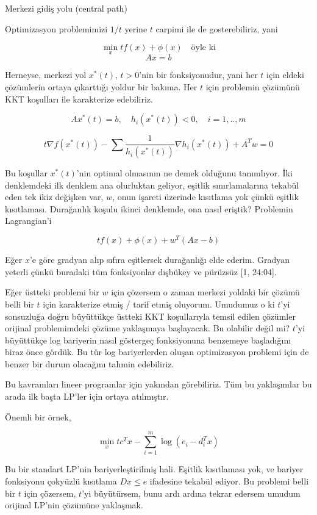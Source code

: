 \documentclass[12pt,fleqn]{article}\usepackage{../../common}
\begin{document}
Merkezi gidiş yolu (central path)

Optimizasyon problemimizi $1/t$ yerine $t$ carpimi ile de gosterebiliriz,
yani

$$
\min_x t f(x) + \phi(x) \quad \textrm{öyle ki}
$$
$$
Ax = b
$$

Herneyse, merkezi yol $x^\ast(t)$, $t>0$'nin bir fonksiyonudur, yani her $t$
için eldeki çözümlerin ortaya çıkarttığı yoldur bir bakıma. Her $t$ için
problemin çözümünü KKT koşulları ile karakterize edebiliriz. 

$$
Ax^\ast(t) = b, \quad h_i(x^\ast(t)) < 0, \quad i=1,..,m
$$

$$
t \nabla f(x^\ast(t)) - \sum \frac{1}{h_i(x^\ast(t))} \nabla h_i(x^\ast(t)) + A^T w= 0
$$

Bu koşullar $x^\ast(t)$'nin optimal olmasının ne demek olduğunu
tanımlıyor. İki denklemdeki ilk denklem ana olurluktan geliyor, eşitlik
sınırlamalarına tekabül eden tek ikiz değişken var, $w$, onun işareti
üzerinde kısıtlama yok çünkü eşitlik kısıtlaması. Durağanlık koşulu ikinci
denklemde, ona nasıl eriştik? Problemin Lagrangian'i

$$
t f(x) + \phi(x) + w^T (Ax - b)
$$

Eğer $x$'e göre gradyan alıp sıfıra eşitlersek durağanlığı elde
ederim. Gradyan yeterli çünkü buradaki tüm fonksiyonlar dışbükey ve
pürüzsüz [1, 24:04]. 

Eğer üstteki problemi bir $w$ için çözersem o zaman merkezi yoldaki bir
çözümü belli bir $t$ için karakterize etmiş / tarif etmiş
oluyorum. Umudumuz o ki $t$'yi sonsuzluğa doğru büyüttükçe üstteki KKT
koşullarıyla temsil edilen çözümler orijinal problemimdeki çözüme
yaklaşmaya başlayacak. Bu olabilir değil mi? $t$'yi büyüttükçe log
bariyerin nasıl göstergeç fonksiyonuna benzemeye başladığını biraz önce
gördük. Bu tür log bariyerlerden oluşan optimizasyon problemi için de
benzer bir durum olacağını tahmin edebiliriz. 

Bu kavramları lineer programlar için yakından görebiliriz. Tüm bu
yaklaşımlar bu arada ilk başta LP'ler için ortaya atılmıştır. 

Önemli bir örnek,

$$
\min_x t c^T x - \sum_{i=1}^{m} \log(e_i - d_i^T x)
$$

Bu bir standart LP'nin bariyerleştirilmiş hali. Eşitlik kısıtlaması yok, ve
bariyer fonksiyonu çokyüzlü kısıtlama  $D x \le e$ ifadesine tekabül
ediyor. Bu problemi belli bir $t$ için çözersem, $t$'yi büyütürsem, bunu
ardı ardına tekrar edersem umudum orijinal LP'nin çözümüne yaklaşmak. 
\end{document}
